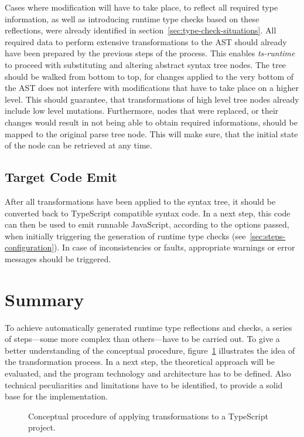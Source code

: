 Cases where modification will have to take place, to reflect all required type information, as well as introducing runtime type checks based on these reflections, were already identified in section~\ref{sec:type-check-situations}. All required data to perform extensive transformations to the AST should already have been prepared by the previous steps of the process. This enables \emph{ts-runtime} to proceed with substituting and altering abstract syntax tree nodes. The tree should be walked from bottom to top, for changes applied to the very bottom of the AST does not interfere with modifications that have to take place on a higher level. This should guarantee, that transformations of high level tree nodes already include low level mutations. Furthermore, nodes that were replaced, or their changes would result in not being able to obtain required informations, should be mapped to the original parse tree node. This will make sure, that the initial state of the node can be retrieved at any time.

\subsection{Target Code Emit}

After all transformations have been applied to the syntax tree, it should be converted back to TypeScript compatible syntax code. In a next step, this code can then be used to emit runnable JavaScript, according to the options passed, when initially triggering the generation of runtime type checks (see~\ref{sec:steps-configuration}). In case of inconsistencies or faults, appropriate warnings or error messages should be triggered.

\section{Summary}
\label{sec:theoretical-approach-summary}

To achieve automatically generated runtime type reflections and checks, a series of steps---some more complex than others---have to be carried out. To give a better understanding of the conceptual procedure, figure~\ref{fig:theoretical-approach} illustrates the idea of the transformation process. In a next step, the theoretical approach will be evaluated, and the program technology and architecture has to be defined. Also technical peculiarities and limitations have to be identified, to provide a solid base for the implementation.
\begin{figure}
\centering

\caption{Conceptual procedure of applying transformations to a TypeScript project.}
\label{fig:theoretical-approach}
\end{figure}

